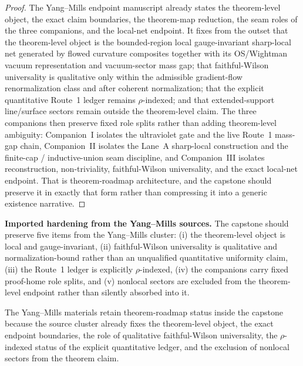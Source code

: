 \begin{proof}
The Yang--Mills endpoint manuscript \ymmaindoc{} already states the theorem-level object, the exact claim boundaries, the theorem-map reduction, the seam roles of the three companions, and the local-net endpoint. It fixes from the outset that the theorem-level object is the bounded-region local gauge-invariant sharp-local net generated by flowed curvature composites together with its OS/Wightman vacuum representation and vacuum-sector mass gap; that faithful-Wilson universality is qualitative only within the admissible gradient-flow renormalization class and after coherent normalization; that the explicit quantitative Route~1 ledger remains $\rho$-indexed; and that extended-support line/surface sectors remain outside the theorem-level claim. The three companions then preserve fixed role splits rather than adding theorem-level ambiguity: Companion~I isolates the ultraviolet gate and the live Route~1 mass-gap chain, Companion~II isolates the Lane~A sharp-local construction and the finite-cap / inductive-union seam discipline, and Companion~III isolates reconstruction, non-triviality, faithful-Wilson universality, and the exact local-net endpoint. That is theorem-roadmap architecture, and the capstone should preserve it in exactly that form rather than compressing it into a generic existence narrative.\cite{MaleyYangMillsNet,MaleyYMCompanionI,MaleyYMCompanionII,MaleyYMCompanionIII}
\end{proof}

\begin{reviewbox}
\textbf{Imported hardening from the Yang--Mills sources.} The capstone should preserve five items from the Yang--Mills cluster: (i) the theorem-level object is local and gauge-invariant, (ii) faithful-Wilson universality is qualitative and normalization-bound rather than an unqualified quantitative uniformity claim, (iii) the Route~1 ledger is explicitly $\rho$-indexed, (iv) the companions carry fixed proof-home role splits, and (v) nonlocal sectors are excluded from the theorem-level endpoint rather than silently absorbed into it.\cite{MaleyYangMillsNet,MaleyYMCompanionI,MaleyYMCompanionII,MaleyYMCompanionIII}
\end{reviewbox}

\begin{proposition}
The Yang--Mills materials retain theorem-roadmap status inside the capstone because the source cluster already fixes the theorem-level object, the exact endpoint boundaries, the role of qualitative faithful-Wilson universality, the $\rho$-indexed status of the explicit quantitative ledger, and the exclusion of nonlocal sectors from the theorem claim.
\end{proposition}

